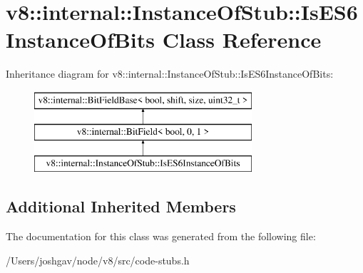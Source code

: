 \hypertarget{classv8_1_1internal_1_1_instance_of_stub_1_1_is_e_s6_instance_of_bits}{}\section{v8\+:\+:internal\+:\+:Instance\+Of\+Stub\+:\+:Is\+E\+S6\+Instance\+Of\+Bits Class Reference}
\label{classv8_1_1internal_1_1_instance_of_stub_1_1_is_e_s6_instance_of_bits}
Inheritance diagram for v8\+:\+:internal\+:\+:Instance\+Of\+Stub\+:\+:Is\+E\+S6\+Instance\+Of\+Bits\+:\begin{figure}[H]
\begin{center}
\leavevmode
\includegraphics[height=3.000000cm]{classv8_1_1internal_1_1_instance_of_stub_1_1_is_e_s6_instance_of_bits}
\end{center}
\end{figure}
\subsection*{Additional Inherited Members}


The documentation for this class was generated from the following file\+:\begin{DoxyCompactItemize}
\item 
/\+Users/joshgav/node/v8/src/code-\/stubs.\+h\end{DoxyCompactItemize}
